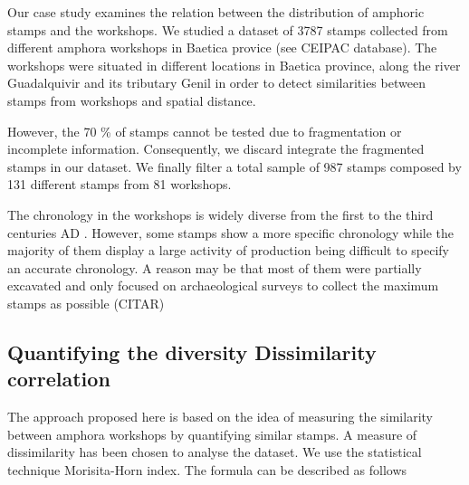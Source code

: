 \documentclass[review]{elsarticle}
\begin{document}
Our case study examines the relation between the distribution of amphoric stamps and the workshops. We studied a dataset of 3787 stamps collected from different amphora workshops in Baetica provice (see CEIPAC database). The workshops were situated in different locations in Baetica province, along the river Guadalquivir and its tributary Genil in order to detect similarities between stamps from workshops and spatial distance. 

However, the 70 \% of stamps cannot be tested due to fragmentation or incomplete information. Consequently, we discard integrate the fragmented stamps in our dataset. We finally filter a total sample of 987 stamps composed by 131 different stamps from 81 workshops. 

The chronology in the workshops is widely diverse from the first to the third centuries AD . However, some stamps show a more specific chronology while the majority of them display a large activity of production being difficult to specify an accurate chronology. A reason may be that most of them were partially excavated and only focused on archaeological surveys to collect the maximum stamps as possible (CITAR) 



\subsection{Quantifying the diversity Dissimilarity correlation}


The approach proposed here is based on the idea of measuring the similarity between amphora workshops by quantifying similar stamps. A measure of dissimilarity has been chosen to analyse the dataset. We use the statistical technique Morisita-Horn index. The formula can be described as follows
\end{document}
